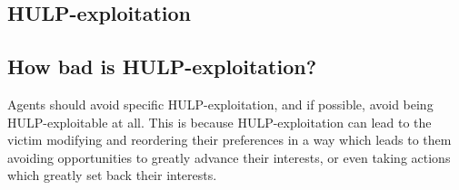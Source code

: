 \documentclass{article}
\begin{document}
\subsection{HULP-exploitation}

\subsection{How bad is HULP-exploitation?}

Agents should avoid specific HULP-exploitation, and if possible, avoid being HULP-exploitable at all. This is because HULP-exploitation can lead to the victim modifying and reordering their preferences in a way which leads to them avoiding opportunities to greatly advance their interests, or even taking actions which greatly set back their interests.



\end{document}
